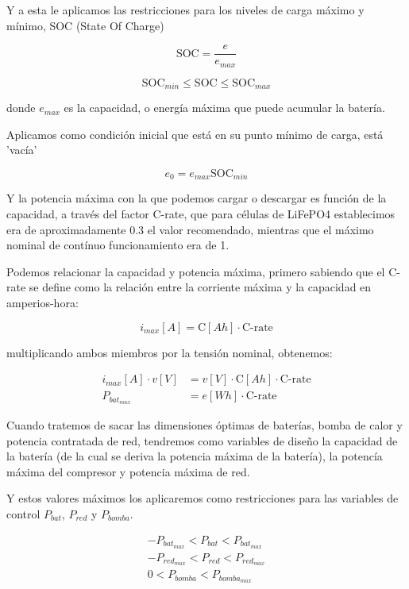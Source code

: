 Y a esta le aplicamos las restricciones para los niveles de carga máximo y
mínimo, SOC (State Of Charge)

\begin{equation}
	\text{SOC} = \frac{e}{e_{max}}
\end{equation}

\begin{equation}
	\text{SOC}_{min} \leq \text{SOC} \leq \text{SOC}_{max}
\end{equation}

donde $e_{max}$ es la capacidad, o energía máxima que puede acumular la batería.

Aplicamos como condición inicial que está en su punto mínimo de carga,
está 'vacía'

\begin{equation}
	e_0 = e_{max} \text{SOC}_{min}
\end{equation}

Y la potencia máxima con la que podemos cargar o descargar es función de la capacidad,
a través del factor C-rate, que para células de LiFePO4 establecimos era de aproximadamente
0.3 el valor recomendado, mientras que el máximo nominal de contínuo funcionamiento era de 1.

Podemos relacionar la capacidad y potencia máxima, primero sabiendo que
el C-rate se define como la relación entre la corriente máxima y la capacidad en amperios-hora:

\begin{equation}
	i_{max}[A] = \text{C}[Ah] \cdot \text{C-rate}
\end{equation}

multiplicando ambos miembros por la tensión nominal, obtenemos:

\begin{align}
	i_{max}[A] \cdot v[V] & = v[V] \cdot \text{C}[Ah] \cdot \text{C-rate} \\
	P_{bat_{max}}         & = e[Wh] \cdot \text{C-rate}
\end{align}

Cuando tratemos de sacar las dimensiones óptimas de baterías, bomba de calor y
potencia contratada de red, tendremos como variables de diseño la capacidad de
la batería (de la cual se deriva la potencia máxima de la batería), la potencía
máxima del compresor y potencia máxima de red.

Y estos valores máximos los aplicaremos como restricciones para las variables
de control $P_{bat}$, $P_{red}$ y $P_{bomba}$.

\begin{align}
	-P_{bat_{max}} < P_{bat} < P_{bat_{max}} \\
	-P_{red_{max}} < P_{red} < P_{red_{max}} \\
	0 < P_{bomba} < P_{bomba_{max}}
\end{align}
